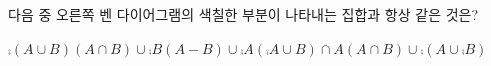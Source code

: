 \noindent\begin{minipage}[t]{0.58\linewidth}\vspace{0pt}\raggedright 다음 중 오른쪽 벤 다이어그램의 색칠한 부분이 나타내는 집합과 항상 같은 것은?\end{minipage}\hfill\begin{minipage}[t]{0.4\linewidth}\vspace{0pt}\centering \resizebox{\ifdim\width>\linewidth\linewidth\else\width\fi}{!}{}\end{minipage}\par
\begin{choicesv}{$\comp{(A\cup B)}$}{$(A\cap B)\cup\comp{B}$}{$(A-B)\cup\comp{A}$}{$(\comp{A}\cup B)\cap A$}{$(A\cap B)\cup\comp{(A\cup\comp{B})}$}\end{choicesv}
